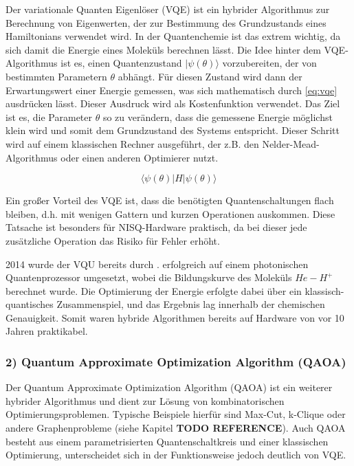 Der variationale Quanten Eigenlöser (VQE) ist ein hybrider Algorithmus zur Berechnung von Eigenwerten, der zur Bestimmung des Grundzustands eines Hamiltonians verwendet wird. In der Quantenchemie ist das extrem wichtig, da sich damit die Energie eines Moleküls berechnen lässt. Die Idee hinter dem VQE-Algorithmus ist es, einen Quantenzustand $|\psi(\theta)\rangle$ vorzubereiten, der von bestimmten Parametern $\theta$ abhängt. Für diesen Zustand wird dann der Erwartungswert einer Energie gemessen, was sich mathematisch durch \autoref{eq:vqe} ausdrücken lässt. Dieser Ausdruck wird als Kostenfunktion verwendet. Das Ziel ist es, die Parameter $\theta$ so zu verändern, dass die gemessene Energie möglichst klein wird und somit dem Grundzustand des Systems entspricht. Dieser Schritt wird auf einem klassischen Rechner ausgeführt, der z.B. den Nelder-Mead-Algorithmus oder einen anderen Optimierer nutzt. 

\begin{equation}
    \langle\psi(\theta)|H|\psi(\theta)\rangle
\label{eq:vqe}
\end{equation}

Ein großer Vorteil des VQE ist, dass die benötigten Quantenschaltungen flach bleiben, d.h. mit wenigen Gattern und kurzen Operationen auskommen. Diese Tatsache ist besonders für NISQ-Hardware praktisch, da bei dieser jede zusätzliche Operation das Risiko für Fehler erhöht.

2014 wurde der VQU bereits durch \citeauthor{peruzzo_variational_nodate}. erfolgreich auf einem photonischen Quantenprozessor umgesetzt, wobei die Bildungskurve des Moleküls $He-H^+$ berechnet wurde. Die Optimierung der Energie erfolgte dabei über ein klassisch-quantisches Zusammenspiel, und das Ergebnis lag innerhalb der chemischen Genauigkeit. Somit waren hybride Algorithmen bereits auf Hardware von vor 10 Jahren praktikabel. \autocite{cerezo_variational_nodate} \autocite{peruzzo_variational_nodate}

\subsubsection*{2) Quantum Approximate Optimization Algorithm (QAOA)}

Der Quantum Approximate Optimization Algorithm (QAOA) ist ein weiterer hybrider Algorithmus und dient zur Lösung von kombinatorischen Optimierungsproblemen. Typische Beispiele hierfür sind Max-Cut, k-Clique oder andere Graphenprobleme (siehe Kapitel \textbf{TODO REFERENCE}). Auch QAOA besteht aus einem parametrisierten Quantenschaltkreis und einer klassischen Optimierung, unterscheidet sich in der Funktionsweise jedoch deutlich von VQE.

